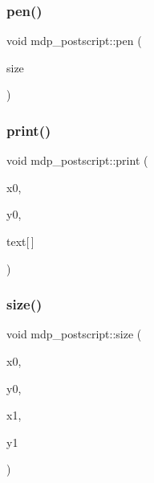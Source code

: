 \mbox{\label{classmdp__postscript_a416d831d67bb6db2512f3e819eee8bf3}} 
\subsubsection{\texorpdfstring{pen()}{pen()}}
{\footnotesize\ttfamily void mdp\+\_\+postscript\+::pen (\begin{DoxyParamCaption}\item[{float}]{size }\end{DoxyParamCaption})\hspace{0.3cm}{\ttfamily [inline]}}

\mbox{\label{classmdp__postscript_a0c67b14a365475f3b5b04d3d033cc4c4}} 
\subsubsection{\texorpdfstring{print()}{print()}}
{\footnotesize\ttfamily void mdp\+\_\+postscript\+::print (\begin{DoxyParamCaption}\item[{float}]{x0,  }\item[{float}]{y0,  }\item[{char}]{text\mbox{[}$\,$\mbox{]} }\end{DoxyParamCaption})\hspace{0.3cm}{\ttfamily [inline]}}

\mbox{\label{classmdp__postscript_af62e32c26c084b83e1a6c318767f2192}} 
\subsubsection{\texorpdfstring{size()}{size()}}
{\footnotesize\ttfamily void mdp\+\_\+postscript\+::size (\begin{DoxyParamCaption}\item[{float}]{x0,  }\item[{float}]{y0,  }\item[{float}]{x1,  }\item[{float}]{y1 }\end{DoxyParamCaption})\hspace{0.3cm}{\ttfamily [inline]}}



